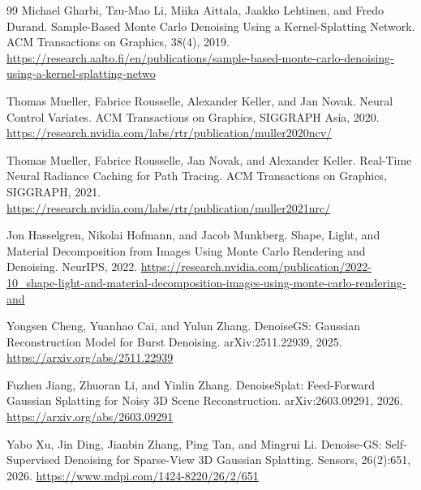 \documentclass[11pt]{article}
\begin{document}
\begin{thebibliography}{99}
Michael Gharbi, Tzu-Mao Li, Miika Aittala, Jaakko Lehtinen, and Fredo Durand.
\newblock Sample-Based Monte Carlo Denoising Using a Kernel-Splatting Network.
\newblock ACM Transactions on Graphics, 38(4), 2019.
\newblock \url{https://research.aalto.fi/en/publications/sample-based-monte-carlo-denoising-using-a-kernel-splatting-netwo}

Thomas Mueller, Fabrice Rousselle, Alexander Keller, and Jan Novak.
\newblock Neural Control Variates.
\newblock ACM Transactions on Graphics, SIGGRAPH Asia, 2020.
\newblock \url{https://research.nvidia.com/labs/rtr/publication/muller2020ncv/}

Thomas Mueller, Fabrice Rousselle, Jan Novak, and Alexander Keller.
\newblock Real-Time Neural Radiance Caching for Path Tracing.
\newblock ACM Transactions on Graphics, SIGGRAPH, 2021.
\newblock \url{https://research.nvidia.com/labs/rtr/publication/muller2021nrc/}

Jon Hasselgren, Nikolai Hofmann, and Jacob Munkberg.
\newblock Shape, Light, and Material Decomposition from Images Using Monte
Carlo Rendering and Denoising.
\newblock NeurIPS, 2022.
\newblock \url{https://research.nvidia.com/publication/2022-10_shape-light-and-material-decomposition-images-using-monte-carlo-rendering-and}

Yongsen Cheng, Yuanhao Cai, and Yulun Zhang.
\newblock DenoiseGS: Gaussian Reconstruction Model for Burst Denoising.
\newblock arXiv:2511.22939, 2025.
\newblock \url{https://arxiv.org/abs/2511.22939}

Fuzhen Jiang, Zhuoran Li, and Yinlin Zhang.
\newblock DenoiseSplat: Feed-Forward Gaussian Splatting for Noisy 3D Scene
Reconstruction.
\newblock arXiv:2603.09291, 2026.
\newblock \url{https://arxiv.org/abs/2603.09291}

Yabo Xu, Jin Ding, Jianbin Zhang, Ping Tan, and Mingrui Li.
\newblock Denoise-GS: Self-Supervised Denoising for Sparse-View 3D Gaussian
Splatting.
\newblock Sensors, 26(2):651, 2026.
\newblock \url{https://www.mdpi.com/1424-8220/26/2/651}

\end{thebibliography}
\end{document}
